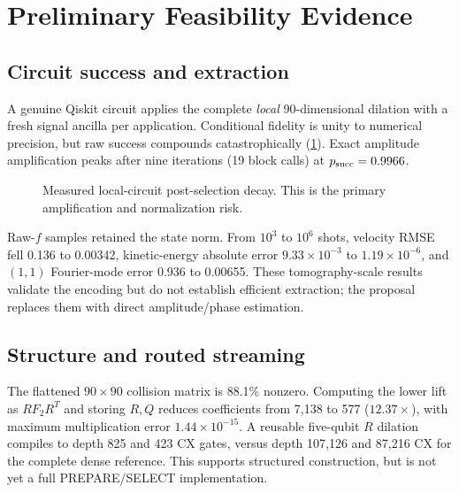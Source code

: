 \documentclass[10pt,twocolumn]{article}
\begin{document}
\section{Preliminary Feasibility Evidence}
\subsection{Circuit success and extraction}
A genuine Qiskit circuit applies the complete \emph{local} 90-dimensional
dilation with a fresh signal ancilla per application. Conditional fidelity is
unity to numerical precision, but raw success compounds catastrophically
(\cref{fig:success}). Exact amplitude amplification peaks after nine iterations
(19 block calls) at $p_{\rm succ}=0.9966$.

\begin{figure}[t]
\centering
{}
\caption{Measured local-circuit post-selection decay. This is the primary
amplification and normalization risk.}
\label{fig:success}
\end{figure}

Raw-$f$ samples retained the state norm. From $10^3$ to $10^6$ shots,
velocity RMSE fell 0.136 to 0.00342, kinetic-energy absolute error
$9.33\times10^{-3}$ to $1.19\times10^{-6}$, and $(1,1)$ Fourier-mode error
0.936 to 0.00655. These tomography-scale results validate the encoding but do
not establish efficient extraction; the proposal replaces them with direct
amplitude/phase estimation.

\subsection{Structure and routed streaming}
The flattened $90\times90$ collision matrix is 88.1\% nonzero. Computing the
lower lift as $RF_2R^T$ and storing $R,Q$ reduces coefficients from 7,138 to
577 ($12.37\times$), with maximum multiplication error
$1.44\times10^{-15}$. A reusable five-qubit $R$ dilation compiles to depth 825
and 423 CX gates, versus depth 107,126 and 87,216 CX for the complete dense
reference. This supports structured construction, but is not yet a full
PREPARE/SELECT implementation.
\end{document}
